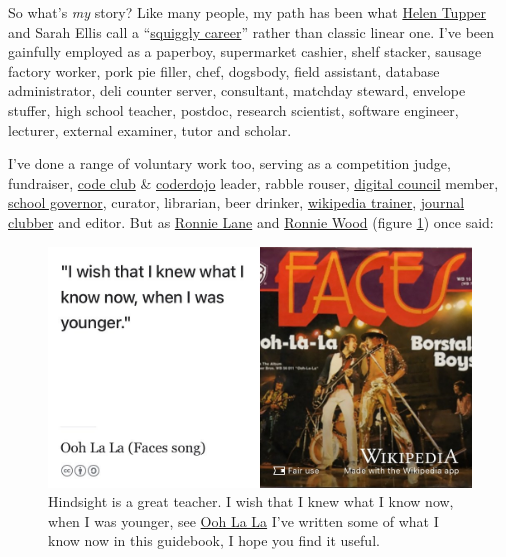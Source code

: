 \documentclass[
]{book}
\begin{document}
So what's \emph{my} story? Like many people, my path has been what \href{https://twitter.com/HelenTupper}{Helen Tupper} and Sarah Ellis call a ``\href{https://www.amazingif.com/books/}{squiggly career}'' rather than classic linear one. \citep{squigglybook, squigglytalk} I've been gainfully employed as a paperboy, supermarket cashier, shelf stacker, sausage factory worker, pork pie filler, chef, dogsbody, field assistant, database administrator, deli counter server, consultant, matchday steward, envelope stuffer, high school teacher, postdoc, research scientist, software engineer, lecturer, external examiner, tutor and scholar.

I've done a range of voluntary work too, serving as a competition judge, fundraiser, \href{https://codeclub.org}{code club} \& \href{https://coderdojo.com}{coderdojo} leader, rabble rouser, \href{https://www.manchesterdigital.com/}{digital council} member, \href{https://governorsforschools.org.uk/}{school governor}, curator, librarian, beer drinker, \href{https://wiki-loves-scientists.org.uk/}{wikipedia trainer}, \href{https://sigcse.cs.manchester.ac.uk/}{journal clubber} and editor. But as \href{https://en.wikipedia.org/wiki/Ronnie_Lane}{Ronnie Lane} and \href{https://en.wikipedia.org/wiki/Ronnie_Wood}{Ronnie Wood} (figure \ref{fig:faces-fig}) once said:

\begin{figure}

{\centering \includegraphics[width=0.99\linewidth]{images/faces} 

}

\caption{Hindsight is a great teacher. I wish that I knew what I know now, when I was younger, see \href{https://en.wikipedia.org/wiki/Ooh_La_La_(Faces_song)}{Ooh La La} \citep{faces} I've written some of what I know now in this guidebook, I hope you find it useful.}\label{fig:faces-fig}
\end{figure}
\end{document}
